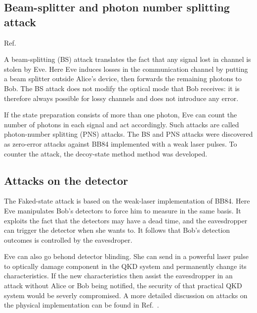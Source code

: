 \subsection{Beam-splitter and photon number splitting attack}


Ref.~\cite{PhysRevLett.68.3121}

A beam-splitting (BS) attack translates the fact that any signal lost in channel is stolen by Eve. Here Eve induces losses in the communication channel by putting a beam splitter outside Alice's device, then forwards the remaining photons to Bob. The BS attack does not modify the optical mode that Bob receives: it is therefore always possible for lossy channels and does not introduce any error.


If the state preparation consists of more than one photon, Eve can count the number of photons in each signal and act accordingly. Such attacks are called photon-number splitting (PNS) attacks. The BS and PNS attacks were discovered as zero-error attacks against BB84 implemented with a weak laser pulses. To counter the attack, the decoy-state method\cite{} method was developed.



\subsection{Attacks on the detector}
The Faked-state attack is based on the weak-laser implementation of BB84. Here Eve manipulates Bob's detectors to force him to measure in the same basis. It exploits the fact that the detectors may have a dead time, and the eavesdropper can trigger the detector when she wants to. 
It follows that Bob's detection outcomes is controlled by the eavesdroper.

Eve can also go behond detector blinding. She can send in a powerful laser pulse to optically damage component in the QKD system and permanently change its characteristics\cite{}. If the new characteristics then assist the eavesdropper in an attack without Alice or Bob being notified, the security of that practical QKD system would be severly compromised.
% 
% 
A more detailed discussion on attacks on the physical implementation can be found in Ref.~\cite{}.

